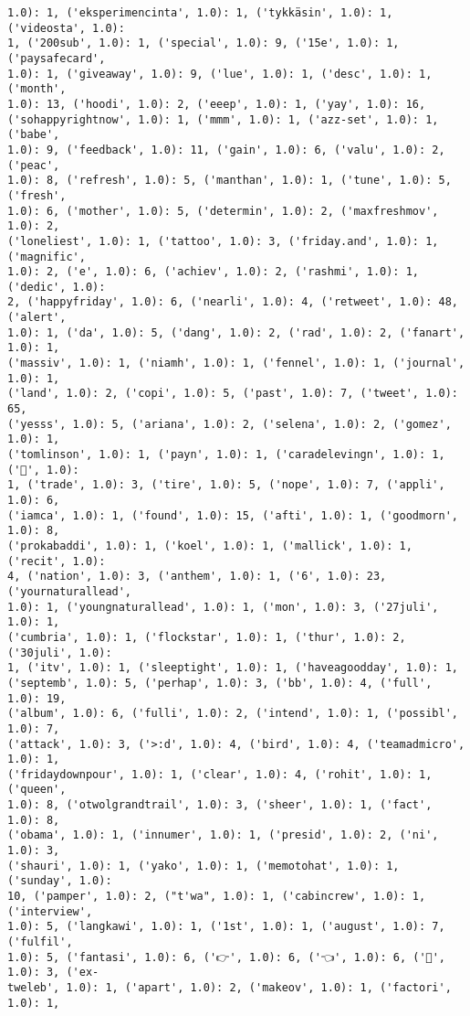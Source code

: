 \documentclass[11pt]{article}
\begin{document}
\begin{Verbatim}[commandchars=\\\{\}]
1.0): 1, ('eksperimencinta', 1.0): 1, ('tykkäsin', 1.0): 1, ('videosta', 1.0):
1, ('200sub', 1.0): 1, ('special', 1.0): 9, ('15e', 1.0): 1, ('paysafecard',
1.0): 1, ('giveaway', 1.0): 9, ('lue', 1.0): 1, ('desc', 1.0): 1, ('month',
1.0): 13, ('hoodi', 1.0): 2, ('eeep', 1.0): 1, ('yay', 1.0): 16,
('sohappyrightnow', 1.0): 1, ('mmm', 1.0): 1, ('azz-set', 1.0): 1, ('babe',
1.0): 9, ('feedback', 1.0): 11, ('gain', 1.0): 6, ('valu', 1.0): 2, ('peac',
1.0): 8, ('refresh', 1.0): 5, ('manthan', 1.0): 1, ('tune', 1.0): 5, ('fresh',
1.0): 6, ('mother', 1.0): 5, ('determin', 1.0): 2, ('maxfreshmov', 1.0): 2,
('loneliest', 1.0): 1, ('tattoo', 1.0): 3, ('friday.and', 1.0): 1, ('magnific',
1.0): 2, ('e', 1.0): 6, ('achiev', 1.0): 2, ('rashmi', 1.0): 1, ('dedic', 1.0):
2, ('happyfriday', 1.0): 6, ('nearli', 1.0): 4, ('retweet', 1.0): 48, ('alert',
1.0): 1, ('da', 1.0): 5, ('dang', 1.0): 2, ('rad', 1.0): 2, ('fanart', 1.0): 1,
('massiv', 1.0): 1, ('niamh', 1.0): 1, ('fennel', 1.0): 1, ('journal', 1.0): 1,
('land', 1.0): 2, ('copi', 1.0): 5, ('past', 1.0): 7, ('tweet', 1.0): 65,
('yesss', 1.0): 5, ('ariana', 1.0): 2, ('selena', 1.0): 2, ('gomez', 1.0): 1,
('tomlinson', 1.0): 1, ('payn', 1.0): 1, ('caradelevingn', 1.0): 1, ('🌷', 1.0):
1, ('trade', 1.0): 3, ('tire', 1.0): 5, ('nope', 1.0): 7, ('appli', 1.0): 6,
('iamca', 1.0): 1, ('found', 1.0): 15, ('afti', 1.0): 1, ('goodmorn', 1.0): 8,
('prokabaddi', 1.0): 1, ('koel', 1.0): 1, ('mallick', 1.0): 1, ('recit', 1.0):
4, ('nation', 1.0): 3, ('anthem', 1.0): 1, ('6', 1.0): 23, ('yournaturallead',
1.0): 1, ('youngnaturallead', 1.0): 1, ('mon', 1.0): 3, ('27juli', 1.0): 1,
('cumbria', 1.0): 1, ('flockstar', 1.0): 1, ('thur', 1.0): 2, ('30juli', 1.0):
1, ('itv', 1.0): 1, ('sleeptight', 1.0): 1, ('haveagoodday', 1.0): 1,
('septemb', 1.0): 5, ('perhap', 1.0): 3, ('bb', 1.0): 4, ('full', 1.0): 19,
('album', 1.0): 6, ('fulli', 1.0): 2, ('intend', 1.0): 1, ('possibl', 1.0): 7,
('attack', 1.0): 3, ('>:d', 1.0): 4, ('bird', 1.0): 4, ('teamadmicro', 1.0): 1,
('fridaydownpour', 1.0): 1, ('clear', 1.0): 4, ('rohit', 1.0): 1, ('queen',
1.0): 8, ('otwolgrandtrail', 1.0): 3, ('sheer', 1.0): 1, ('fact', 1.0): 8,
('obama', 1.0): 1, ('innumer', 1.0): 1, ('presid', 1.0): 2, ('ni', 1.0): 3,
('shauri', 1.0): 1, ('yako', 1.0): 1, ('memotohat', 1.0): 1, ('sunday', 1.0):
10, ('pamper', 1.0): 2, ("t'wa", 1.0): 1, ('cabincrew', 1.0): 1, ('interview',
1.0): 5, ('langkawi', 1.0): 1, ('1st', 1.0): 1, ('august', 1.0): 7, ('fulfil',
1.0): 5, ('fantasi', 1.0): 6, ('👉', 1.0): 6, ('👈', 1.0): 6, ('💖', 1.0): 3, ('ex-
tweleb', 1.0): 1, ('apart', 1.0): 2, ('makeov', 1.0): 1, ('factori', 1.0): 1,

\end{Verbatim}
\end{document}
